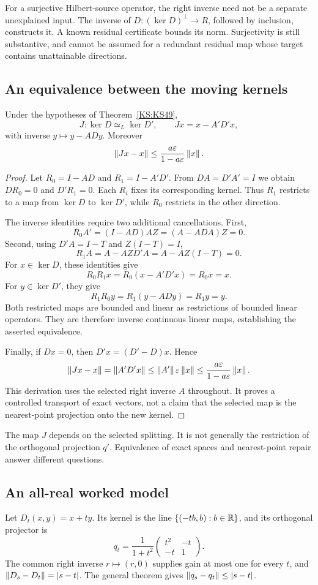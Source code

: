 For a surjective Hilbert-source operator, the right inverse need not be a separate unexplained input. The inverse of \(D:(\ker D)^\perp\to R\), followed by inclusion, constructs it. A known residual certificate bounds its norm. Surjectivity is still substantive, and cannot be assumed for a redundant residual map whose target contains unattainable directions.

\subsection{An equivalence between the moving kernels}
\begin{KStheorem}\label{KS:KS50}
Under the hypotheses of Theorem~\ref{KS:KS49},
\[
 J:\ker D\simeq_L\ker D',\qquad Jx=x-A'D'x,
\]
with inverse \(y\mapsto y-ADy\). Moreover
\[
 \left\lVert Jx-x\right\rVert\le\frac{a\varepsilon}{1-a\varepsilon}\left\lVert x\right\rVert.
\]
\end{KStheorem}
\begin{proof}
Let $R_0=I-AD$ and $R_1=I-A'D'$. From $DA=D'A'=I$ we obtain $DR_0=0$ and $D'R_1=0$. Each $R_i$ fixes its corresponding kernel. Thus $R_1$ restricts to a map from $\ker D$ to $\ker D'$, while $R_0$ restricts in the other direction.

The inverse identities require two additional cancellations. First,
\[
 R_0A'=(I-AD)AZ=(A-ADA)Z=0.
\]
Second, using $D'A=I-T$ and $Z(I-T)=I$,
\[
 R_1A=A-AZD'A=A-AZ(I-T)=0.
\]
For $x\in\ker D$, these identities give
\[
 R_0R_1x=R_0(x-A'D'x)=R_0x=x.
\]
For $y\in\ker D'$, they give
\[
 R_1R_0y=R_1(y-ADy)=R_1y=y.
\]
Both restricted maps are bounded and linear as restrictions of bounded linear operators. They are therefore inverse continuous linear maps, establishing the asserted equivalence.

Finally, if $Dx=0$, then $D'x=(D'-D)x$. Hence
\[
 \left\lVert Jx-x\right\rVert=\left\lVert A'D'x\right\rVert
 \le\left\lVert A'\right\rVert\varepsilon\left\lVert x\right\rVert
 \le\frac{a\varepsilon}{1-a\varepsilon}\left\lVert x\right\rVert.
\]
This derivation uses the selected right inverse $A$ throughout. It proves a controlled transport of exact vectors, not a claim that the selected map is the nearest-point projection onto the new kernel.
\end{proof}
The map \(J\) depends on the selected splitting. It is not generally the restriction of the orthogonal projection \(q'\). Equivalence of exact spaces and nearest-point repair answer different questions.

\subsection{An all-real worked model}
Let \(D_t(x,y)=x+ty\). Its kernel is the line \(\{(-tb,b):b\in\mathbb R\}\), and its orthogonal projector is
\begin{equation}\label{KS:eq:lineprojector}
 q_t=\frac1{1+t^2}
 \begin{pmatrix}t^2&-t\\-t&1\end{pmatrix}.
\end{equation}
The common right inverse \(r\mapsto(r,0)\) supplies gain at most one for every \(t\), and \(\left\lVert D_s-D_t\right\rVert=|s-t|\). The general theorem gives \(\left\lVert q_s-q_t\right\rVert\le|s-t|\).

